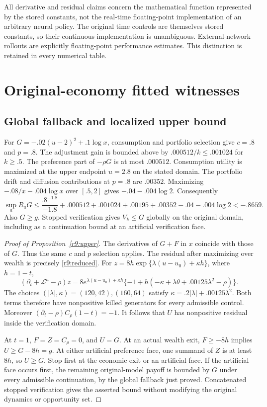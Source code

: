 All derivative and residual claims concern the mathematical function represented by the stored constants, not the real-time floating-point implementation of an arbitrary neural policy. The original time controls are themselves stored constants, so their continuous implementation is unambiguous. External-network rollouts are explicitly floating-point performance estimates. This distinction is retained in every numerical table.

\section{Original-economy fitted witnesses}\label{r9:proof:upper}
\subsection{Global fallback and localized upper bound}
For $G=-.02(u-2)^2+.1\log x$, consumption and portfolio selection give $c=.8$ and $p=.8$. The adjustment gain is bounded above by $.000512/k\leq.001024$ for $k\geq.5$. The preference part of $-\rho G$ is at most $.000512$. Consumption utility is maximized at the upper endpoint $u=2.8$ on the stated domain. The portfolio drift and diffusion contributions at $p=.8$ are $.00352$. Maximizing $-.08/x-.004\log x$ over $[.5,2]$ gives $-.04-.004\log2$. Consequently
\[
 \sup_aR_aG\leq\frac{.8^{-1.8}}{-1.8}+.000512+.001024+.00195+.00352-.04-.004\log2<-.8659.
\]
Also $G\geq g$. Stopped verification gives $V_k\leq G$ globally on the original domain, including as a continuation bound at an artificial verification face.

\begin{proof}[Proof of Proposition~\ref{r9:upper}]
The derivatives of $G+F$ in $x$ coincide with those of $G$. Thus the same $c$ and $p$ selection applies. The residual after maximizing over wealth is precisely \eqref{r9:reduced}. For $z=8h\exp\{\lambda(u-u_0)+\kappa h\}$, where $h=1-t$,
\[
 (\partial_t+\mathcal L^a-\rho)z
 =8e^{\lambda(u-u_0)+\kappa h}
 \{-1+h(-\kappa+\lambda\theta+.00125\lambda^2-\rho)\}.
\]
The choices $(|\lambda|,\kappa)=(120,42),(160,64)$ satisfy $\kappa=.2|\lambda|+.00125\lambda^2$. Both terms therefore have nonpositive killed generators for every admissible control. Moreover $(\partial_t-\rho)C_\rho(1-t)=-1$. It follows that $U$ has nonpositive residual inside the verification domain.

At $t=1$, $F=Z=C_\rho=0$, and $U=G$. At an actual wealth exit, $F\geq-8h$ implies $U\geq G-8h=g$. At either artificial preference face, one summand of $Z$ is at least $8h$, so $U\geq G$. Stop first at the economic exit or an artificial face. If the artificial face occurs first, the remaining original-model payoff is bounded by $G$ under every admissible continuation, by the global fallback just proved. Concatenated stopped verification gives the asserted bound without modifying the original dynamics or opportunity set.
\end{proof}

